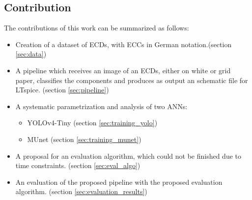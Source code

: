 \subsection{Contribution}

The contributions of this work can be summarized as follows:

\begin{itemize}
    \item Creation of a dataset of \acp{ECD}, with \acp{ECC} in German notation.(section \ref{sec:data})

    \item A pipeline which receives an image of an \acp{ECD}, either on white or grid paper, classifies the components and produces as output an schematic file for LTspice. (section \ref{sec:pipeline})

    \item A systematic parametrization and analysis of two \acp{ANN}:
    \begin{itemize}
        \item \ac{YOLOv4}-Tiny (section \ref{sec:training_yolo})
        \item \ac{MUnet} (section \ref{sec:training_munet})
    \end{itemize}

    \item A proposal for an evaluation algorithm, which could not be finished due to time constraints. (section \ref{sec:eval_algo})

    \item An evaluation of the proposed pipeline with the proposed evaluation algorithm. (section \ref{sec:evaluation_results})
\end{itemize}
